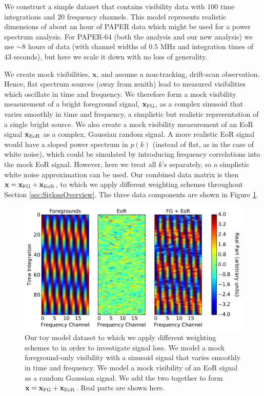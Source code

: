 \documentclass[preprint2,numberedappendix,tighten]{aastex6}
\begin{document}
We construct a simple dataset that contains visibility data with $100$ time 
integrations and $20$ frequency channels. This model represents realistic dimensions of about an hour of PAPER data which 
might be used for a power spectrum analysis. For PAPER-64 (both the  analysis and our new analysis) we use $\sim8$ hours of data (with channel 
widths of $0.5$ MHz and integration times of $43$ seconds), but here we scale it down with no loss of 
generality. 

We create mock visibilities, $\textbf{x}$, and assume a non-tracking, drift-scan observation. Hence, flat spectrum sources (away 
from zenith) lead to measured visibilities which oscillate in time and frequency. We therefore form a mock visibility measurement of a bright foreground signal, $
\textbf{x}_{\rm FG}$, as a complex sinusoid that varies smoothly in time and frequency, a simplistic but realistic representation of a 
single bright source. We also create a mock visibility measurement of an EoR signal $\textbf{x}_{\rm EoR}$ as a complex, Gaussian random signal. A more 
realistic EoR signal would have a sloped power spectrum in $p(k)$ (instead of flat, as in the case of white noise), 
which could be simulated by introducing frequency correlations into the mock EoR signal. However, here we treat all 
$k$'s separately, so a simplistic white noise approximation can be used. Our combined data matrix is then $\textbf{x} = 
\textbf{x}_{\rm FG} + \textbf{x}_{\rm EoR}$, to which we apply different weighting schemes throughout Section \ref{sec:SiglossOverview}. The three data components are shown in Figure 
\ref{fig:toy_sigloss1}. 

\begin{figure}
	\centering
	\includegraphics[trim={0cm 0cm 0cm 0cm},clip,width=\columnwidth]{plots/toy_sigloss1.pdf}
	\caption{Our toy model dataset to which we apply different weighting schemes to in order to investigate signal loss. We model a mock foreground-only visibility with a sinusoid signal that varies smoothly in 
time and frequency. We model a mock visibility of an EoR signal as a random Gaussian signal. We add the two together to form $\textbf{x} = 
\textbf{x}_{\rm FG} + \textbf{x}_{\rm EoR}$. Real parts are shown here.}
	\label{fig:toy_sigloss1}
\end{figure}
\end{document}
